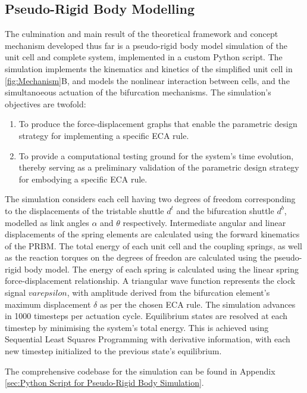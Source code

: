 \subsection*{Pseudo-Rigid Body Modelling}

The culmination and main result of the theoretical framework and concept mechanism developed thus far is a pseudo-rigid body model simulation of the unit cell and complete system, implemented in a custom Python script. The simulation implements the kinematics and kinetics of the simplified unit cell in \autoref*{fig:Mechanism}B, and models the nonlinear interaction between cells, and the simultanoeous actuation of the bifurcation mechanisms. 
The simulation's objectives are twofold:
\begin{enumerate}
    \item To produce the force-displacement graphs that enable the parametric design strategy for implementing a specific ECA rule.
    \item To provide a computational testing ground for the system's time evolution, thereby serving as a preliminary validation of the parametric design strategy for embodying a specific ECA rule.
\end{enumerate}


The simulation considers each cell having two degrees of freedom corresponding to the displacements of the tristable shuttle \( d^t \) and the bifurcation shuttle \( d^b \), modelled as link angles \(\alpha\) and \(\theta\) respectively. Intermediate angular and linear displacements of the spring elements are calculated using the forward kinematics of the PRBM. The total energy of each unit cell and the coupling springs, as well as the reaction torques on the degrees of freedon are calculated using the pseudo-rigid body model. The energy of each spring is calculated using the linear spring force-displacement relationship. A triangular wave function represents the clock signal 
\(varepsilon\), with amplitude derived from the bifurcation element's maximum displacement \(\delta\) as per the chosen ECA rule. The simulation advances in 1000 timesteps per actuation cycle. Equilibrium states are resolved at each timestep by minimising the system's total energy. This is achieved using Sequential Least Squares Programming with derivative information, with each new timestep initialized to the previous state's equilibrium.


The comprehensive codebase for the simulation can be found in Appendix \ref*{sec:Python Script for Pseudo-Rigid Body Simulation}.

